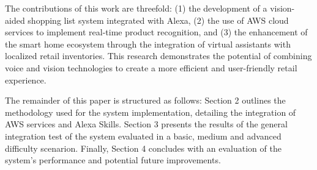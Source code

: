 The contributions of this work are threefold: (1) the development of a vision-aided shopping list system integrated with Alexa, (2) the use of AWS cloud services to implement real-time product recognition, and (3) the enhancement of the smart home ecosystem through the integration of virtual assistants with localized retail inventories. This research demonstrates the potential of combining voice and vision technologies to create a more efficient and user-friendly retail experience.

The remainder of this paper is structured as follows: Section 2 outlines the methodology used for the system implementation, detailing the integration of AWS services and Alexa Skills. Section 3 presents the results of the general integration test of the system evaluated in a basic, medium and advanced difficulty scenarion. Finally, Section 4 concludes with an evaluation of the system's performance and potential future improvements.